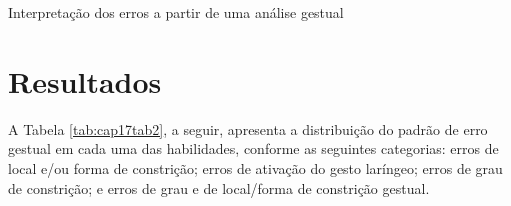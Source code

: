 \documentclass[output=paper,colorlinks,citecolor=brown,booklanguage=portuguese]{langscibook}
\begin{document}
\begin{Tabela}
    \caption{{Interpretação dos erros a partir de uma análise gestual \citep[90]{Berti2019}}}
    \label{tab:cap17tab1}
\end{Tabela}

\section{Resultados}
A Tabela \ref{tab:cap17tab2}, a seguir, apresenta a distribuição do padrão de erro gestual em cada uma das habilidades, conforme as seguintes categorias: erros de local e/ou forma de constrição; erros de ativação do gesto laríngeo; erros de grau de constrição; e erros de grau e de local/forma de constrição gestual. 
\end{document}
